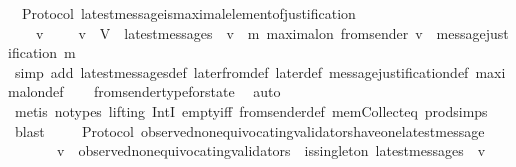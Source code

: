 \begin{isabellebody}
{\isafoldproof}%
%
\isadelimproof
\isanewline
%
\endisadelimproof
\isanewline
{}\isamarkupfalse%
\ {\isacharparenleft}\ Protocol{\isacharparenright}\ latest{\isacharunderscore}message{\isacharunderscore}is{\isacharunderscore}maximal{\isacharunderscore}element{\isacharunderscore}of{\isacharunderscore}justification\ {\isacharcolon}\isanewline
\ \ {\isachardoublequoteopen}{\isasymforall}\ {\isasymsigma}\ v{\isachardot}\ {\isasymsigma}\ {\isasymin}\ {\isasymSigma}\ {\isasymand}\ v\ {\isasymin}\ V\ {\isasymlongrightarrow}\ latest{\isacharunderscore}messages\ {\isasymsigma}\ v\ {\isacharequal}\ {\isacharbraceleft}m{\isachardot}\ maximal{\isacharunderscore}on\ {\isacharparenleft}from{\isacharunderscore}sender\ {\isacharparenleft}v{\isacharcomma}\ {\isasymsigma}{\isacharparenright}{\isacharparenright}\ message{\isacharunderscore}justification\ m{\isacharbraceright}{\isachardoublequoteclose}\isanewline
%
\isadelimproof
\ \ %
\endisadelimproof
%
\isatagproof
{}\isamarkupfalse%
\ {\isacharparenleft}simp\ add{\isacharcolon}\ latest{\isacharunderscore}messages{\isacharunderscore}def\ later{\isacharunderscore}from{\isacharunderscore}def\ later{\isacharunderscore}def\ message{\isacharunderscore}justification{\isacharunderscore}def\ maximal{\isacharunderscore}on{\isacharunderscore}def{\isacharparenright}\isanewline
\ \ \isamarkupfalse%
\ from{\isacharunderscore}sender{\isacharunderscore}type{\isacharunderscore}for{\isacharunderscore}state\ \isamarkupfalse%
\ auto\isanewline
\ \ \isamarkupfalse%
\ {\isacharparenleft}metis\ {\isacharparenleft}no{\isacharunderscore}types{\isacharcomma}\ lifting{\isacharparenright}\ IntI\ empty{\isacharunderscore}iff\ from{\isacharunderscore}sender{\isacharunderscore}def\ mem{\isacharunderscore}Collect{\isacharunderscore}eq\ prod{\isachardot}simps{\isacharparenleft}{}{\isacharparenright}{\isacharparenright}\isanewline
\ \ \isamarkupfalse%
\ blast%
\endisatagproof
{\isafoldproof}%
%
\isadelimproof
\ \ \isanewline
%
\endisadelimproof
\isanewline
\isanewline
{}\isamarkupfalse%
\ {\isacharparenleft}\ Protocol{\isacharparenright}\ observed{\isacharunderscore}non{\isacharunderscore}equivocating{\isacharunderscore}validators{\isacharunderscore}have{\isacharunderscore}one{\isacharunderscore}latest{\isacharunderscore}message{\isacharcolon}\isanewline
\ \ {\isachardoublequoteopen}{\isasymforall}\ {\isasymsigma}\ {\isasymin}\ {\isasymSigma}{\isachardot}\ {\isacharparenleft}{\isasymforall}\ v\ {\isasymin}\ observed{\isacharunderscore}non{\isacharunderscore}equivocating{\isacharunderscore}validators\ {\isasymsigma}{\isachardot}\ is{\isacharunderscore}singleton\ {\isacharparenleft}latest{\isacharunderscore}messages\ {\isasymsigma}\ v{\isacharparenright}{\isacharparenright}{\isachardoublequoteclose}\ \ \isanewline

\end{isabellebody}
